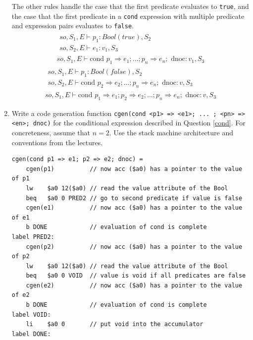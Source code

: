 \documentclass[11pt]{article}
\begin{document}
\begin{enumerate}
The other rules handle the case that the first predicate evaluates to
\texttt{true}, and the case that the first predicate in a
\texttt{cond} expression with multiple predicate and expression pairs
evaluates to \texttt{false}.
\begin{equation}
\begin{array}{c}
\begin{array}{l}
so, S_{1}, E \vdash p_{1} : Bool(true), S_{2} \\
so, S_{2}, E \vdash e_{1} : v_{1}, S_{3}
\end{array} \\
\hline
so, S_{1}, E \vdash \text{cond } p_{1} \Rightarrow e_{1} ; \dots ;
p_{n} \Rightarrow e_{n} ; \text{ dnoc} : v_{1}, S_{3}
\end{array}
\tag*{[Cond-True]}
\end{equation}
\begin{equation}
\begin{array}{c}
\begin{array}{l}
so, S_{1}, E \vdash p_{1} : Bool(false), S_{2} \\
so, S_{2}, E \vdash \text{cond } p_{2} \Rightarrow e_{2} ; \dots ;
p_{n} \Rightarrow e_{n} ; \text{ dnoc} : v, S_{3}
\end{array} \\
\hline
so, S_{1}, E \vdash \text{cond } p_{1} \Rightarrow e_{1} ;
p_{2} \Rightarrow e_{2} ; \dots ; p_{n} \Rightarrow e_{n} ;
\text{ dnoc} : v, S_{3}
\end{array}
\tag*{[Cond-Multiple-False]}
\end{equation}

\item
Write a code generation function
\texttt{cgen(cond <p1> => <e1>; ... ; <pn> => <en>; dnoc)} for the
conditional expression described in Question \ref{cond}.  For
concreteness, assume that $n = 2$.  Use the stack machine architecture
and conventions from the lectures.

\begin{verbatim}
cgen(cond p1 => e1; p2 => e2; dnoc) =
    cgen(p1)          // now acc ($a0) has a pointer to the value of p1
    lw    $a0 12($a0) // read the value attribute of the Bool
    beq   $a0 0 PRED2 // go to second predicate if value is false
    cgen(e1)          // now acc ($a0) has a pointer to the value of e1
    b DONE            // evaluation of cond is complete
label PRED2:
    cgen(p2)          // now acc ($a0) has a pointer to the value of p2
    lw    $a0 12($a0) // read the value attribute of the Bool
    beq   $a0 0 VOID  // value is void if all predicates are false
    cgen(e2)          // now acc ($a0) has a pointer to the value of e2
    b DONE            // evaluation of cond is complete
label VOID:
    li    $a0 0       // put void into the accumulator
label DONE:
\end{verbatim}


\end{enumerate}
\end{document}
